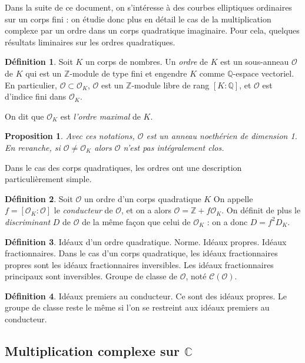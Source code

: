 \documentclass[11pt,a4paper]{article}
\newcommand{\Z}{\mathbb{Z}}
\newcommand{\C}{\mathbb{C}}
\newcommand{\Q}{\mathbb{Q}}
\renewcommand{\O}{\mathcal{O}}
\newcommand{\Cl}{\mathcal{C}}
\newtheorem*{prop}{Proposition}
\theoremstyle{definition}
\newtheorem*{defi}{Définition}
\begin{document}
Dans la suite de ce document, on s'intéresse à des courbes elliptiques ordinaires sur un corps fini : on étudie donc plus en détail le cas de la multiplication complexe par un ordre dans un corps quadratique imaginaire. Pour cela, quelques résultats liminaires sur les ordres quadratiques.


\begin{defi}
Soit $K$ un corps de nombres. Un \emph{ordre} de $K$ est un sous-anneau $\O$ de $K$ qui est un $\Z$-module de type fini et engendre $K$ comme $\Q$-espace vectoriel. En particulier, $\O\subset \O_K$, $\O$ est un $\Z$-module libre de rang $[K:\Q]$, et $\O$ est d'indice fini dans $\O_K$.

On dit que $\O_K$ est \emph{l'ordre maximal} de $K$.
\end{defi}

\begin{prop}
Avec ces notations, $\O$ est un anneau noethérien de dimension 1. En revanche, si $\O\neq \O_K$ alors $\O$ n'est pas intégralement clos.
\end{prop}

Dans le cas des corps quadratiques, les ordres ont une description particulièrement simple.

\begin{defi}
Soit $\O$ un ordre d'un corps quadratique $K$ On appelle $f=[\O_K:\O]$ le \emph{conducteur} de $\O$, et on a alors $\O=\Z+f \O_K$. On définit de plus le \emph{discriminant} $D$ de $\O$ de la même façon que celui de $\O_K$ : on a donc $D=f^2 D_K$.
\end{defi}

\begin{defi}
Idéaux d'un ordre quadratique. Norme. Idéaux propres. Idéaux fractionnaires. Dans le cas d'un corps quadratique, les idéaux fractionnaires propres sont les idéaux fractionnaires inversibles. Les idéaux fractionnaires principaux sont inversibles. Groupe de classe de $\O$, noté $\Cl(\O)$.
\end{defi}

\begin{defi}
Idéaux premiers au conducteur. Ce sont des idéaux propres. Le groupe de classe reste le même si l'on se restreint aux idéaux premiers au conducteur.
\end{defi}



\subsection{Multiplication complexe sur $\C$}
\end{document}
